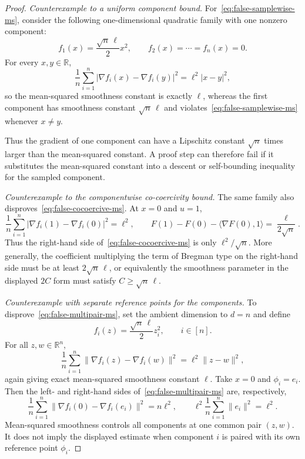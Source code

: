 \documentclass{article}
\theoremstyle{definition}
\begin{document}
\begin{proof}
\emph{Counterexample to a uniform component bound.}
For~\eqref{eq:false-samplewise-ms}, consider the following one-dimensional
quadratic family with one nonzero component:
\begin{equation}
    f_1(x)=\frac{\sqrt n\,\ell}{2}x^2,
    \qquad
    f_2(x)=\cdots=f_n(x)=0.
    \label{eq:one-spike-quadratic}
\end{equation}
For every $x,y\in\mathbb R$,
\begin{equation}
    \frac1n\sum_{i=1}^n
    |\nabla f_i(x)-\nabla f_i(y)|^2
    =\ell^2|x-y|^2,
    \label{eq:one-spike-ms-exact}
\end{equation}
so the mean-squared smoothness constant is exactly $\ell$, whereas the first component has smoothness constant $\sqrt n\,\ell$ and violates~\eqref{eq:false-samplewise-ms} whenever $x\ne y$.

Thus the gradient of one component can have a Lipschitz constant $\sqrt n$
times larger than the mean-squared constant.  A proof step can therefore fail if it
substitutes the mean-squared constant into a descent or self-bounding inequality
for the sampled component.

\emph{Counterexample to the componentwise co-coercivity bound.}
The same family also disproves~\eqref{eq:false-cocoercive-ms}.  At $x=0$ and $u=1$,
\begin{equation}
    \frac1n\sum_{i=1}^n
    |\nabla f_i(1)-\nabla f_i(0)|^2=\ell^2,
    \qquad
    F(1)-F(0)-\langle\nabla F(0),1\rangle
    =\frac{\ell}{2\sqrt n}.
    \label{eq:one-spike-cocoercive-gap}
\end{equation}
Thus the right-hand side of~\eqref{eq:false-cocoercive-ms} is only $\ell^2/\sqrt n$.  More generally, the coefficient multiplying the term of Bregman type on the right-hand side must be at least $2\sqrt n\,\ell$, or equivalently the smoothness parameter in the displayed $2C$ form must satisfy $C\ge\sqrt n\,\ell$.

\emph{Counterexample with separate reference points for the components.}
To disprove~\eqref{eq:false-multipair-ms}, set the ambient dimension to $d=n$
and define
\begin{equation}
    f_i(z)=\frac{\sqrt n\,\ell}{2}z_i^2,
    \qquad i\in[n].
    \label{eq:coordinate-spike-quadratic}
\end{equation}
For all $z,w\in\mathbb R^n$,
\begin{equation}
    \frac1n\sum_{i=1}^n
    \|\nabla f_i(z)-\nabla f_i(w)\|^2
    =\ell^2\|z-w\|^2,
    \label{eq:coordinate-spike-ms-exact}
\end{equation}
again giving exact mean-squared smoothness constant $\ell$.  Take $x=0$ and $\phi_i=e_i$.  Then the left- and right-hand sides of~\eqref{eq:false-multipair-ms} are, respectively,
\begin{equation}
    \frac1n\sum_{i=1}^n
    \|\nabla f_i(0)-\nabla f_i(e_i)\|^2
    =n\ell^2,
    \qquad
    \ell^2\frac1n\sum_{i=1}^n\|e_i\|^2=\ell^2.
\end{equation}
Mean-squared smoothness controls all components at one common pair $(z,w)$.  It
does not imply the displayed estimate when component $i$ is paired with its own
reference point $\phi_i$.
\end{proof}
\end{document}
